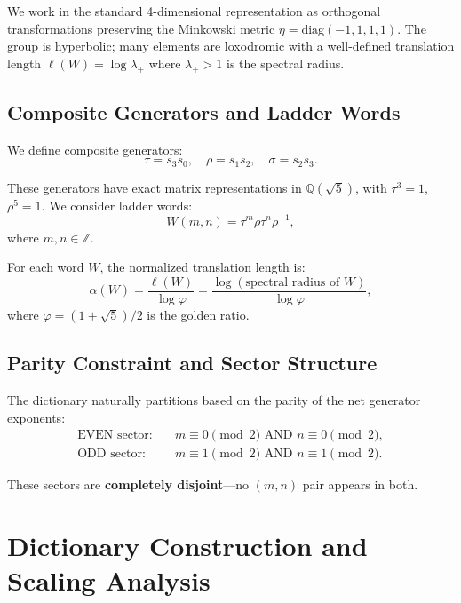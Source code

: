 \documentclass[11pt,a4paper]{article}
\begin{document}
We work in the standard 4-dimensional representation as orthogonal transformations preserving the Minkowski metric $\eta = \text{diag}(-1,1,1,1)$. The group is hyperbolic; many elements are loxodromic with a well-defined translation length $\ell(W) = \log\lambda_+$ where $\lambda_+ > 1$ is the spectral radius.

\subsection{Composite Generators and Ladder Words}

We define composite generators:
\begin{equation}
\tau = s_3 s_0, \quad \rho = s_1 s_2, \quad \sigma = s_2 s_3.
\end{equation}

These generators have exact matrix representations in $\mathbb{Q}(\sqrt{5})$, with $\tau^3 = 1$, $\rho^5 = 1$. We consider ladder words:
\begin{equation}
W(m,n) = \tau^m \rho \tau^n \rho^{-1},
\end{equation}
where $m, n \in \mathbb{Z}$.

For each word $W$, the normalized translation length is:
\begin{equation}
\alpha(W) = \frac{\ell(W)}{\log\varphi} = \frac{\log(\text{spectral radius of } W)}{\log\varphi},
\end{equation}
where $\varphi = (1+\sqrt{5})/2$ is the golden ratio.

\subsection{Parity Constraint and Sector Structure}

The dictionary naturally partitions based on the parity of the net generator exponents:
\begin{align}
\text{EVEN sector:} \quad &m \equiv 0 \pmod{2} \text{ AND } n \equiv 0 \pmod{2}, \\
\text{ODD sector:} \quad &m \equiv 1 \pmod{2} \text{ AND } n \equiv 1 \pmod{2}.
\end{align}

These sectors are \textbf{completely disjoint}—no $(m,n)$ pair appears in both.

\section{Dictionary Construction and Scaling Analysis}
\end{document}
